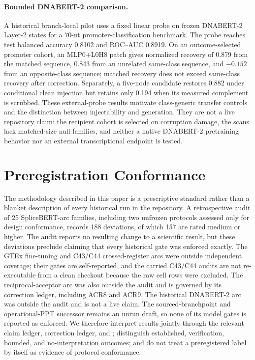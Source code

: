 \documentclass{article}
\begin{document}
\paragraph{Bounded DNABERT-2 comparison.}
A historical branch-local pilot uses a fixed linear probe on frozen DNABERT-2 Layer-2 states for a 70-nt promoter-classification benchmark. The probe reaches test balanced accuracy 0.8102 and ROC--AUC 0.8919. On an outcome-selected promoter cohort, an MLP0+L0H8 patch gives normalized recovery of 0.879 from the matched sequence, 0.843 from an unrelated same-class sequence, and \(-0.152\) from an opposite-class sequence; matched recovery does not exceed same-class recovery after correction. Separately, a five-node candidate restores 0.882 under conditional clean injection but retains only 0.194 when its measured complement is scrubbed. These external-probe results motivate class-generic transfer controls and the distinction between injectability and generation. They are not a live repository claim: the recipient cohort is selected on corruption damage, the scans lack matched-size null families, and neither a native DNABERT-2 pretraining behavior nor an external transcriptional endpoint is tested.

\section{Preregistration Conformance}
\label{app:conformance}

The methodology described in this paper is a prescriptive standard rather than a blanket description of every historical run in the repository. A retrospective audit of 25 SpliceBERT-arc families, including two unfrozen protocols assessed only for design conformance, records 188 deviations, of which 157 are rated medium or higher. The audit reports no resulting change to a scientific result, but these deviations preclude claiming that every historical gate was enforced exactly. The GTEx fine-tuning and C43/C44 crossed-register arcs were outside independent coverage; their gates are self-reported, and the carried C43/C44 audits are not re-executable from a clean checkout because the raw cell rows were excluded. The reciprocal-acceptor arc was also outside the audit and is governed by its correction ledger, including ACR8 and ACR9. The historical DNABERT-2 arc was outside the audit and is not a live claim. The sourced-branchpoint and operational-PPT successor remains an unrun draft, so none of its model gates is reported as enforced. We therefore interpret results jointly through the relevant claim ledger, correction ledger, and ; distinguish established, verification, bounded, and no-interpretation outcomes; and do not treat a preregistered label by itself as evidence of protocol conformance.
\end{document}
